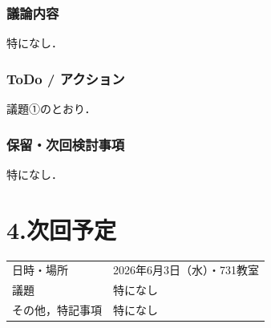 \documentclass[a4paper,12pt]{ltjsarticle}
\begin{document}
\subsubsection*{議論内容}
特になし．

\subsubsection*{ToDo / アクション}
議題①のとおり．

\subsubsection*{保留・次回検討事項}
特になし．

\section*{4.次回予定}
\begin{tabular}{ll}
  \toprule
  日時・場所 & 2026年6月3日（水）・731教室 \\
  議題       & 特になし \\
  その他，特記事項 & 特になし \\
  \bottomrule
\end{tabular}
\end{document}
